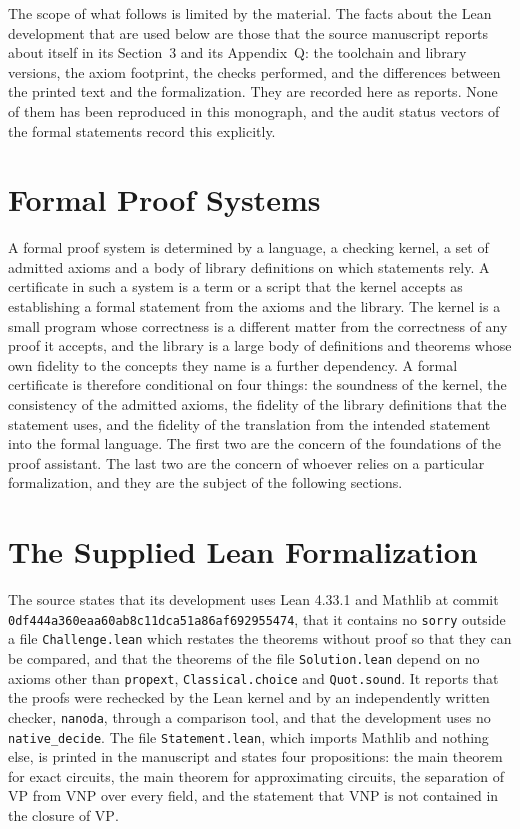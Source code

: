 \documentclass[11pt,letterpaper]{report}
\theoremstyle{plain}
\theoremstyle{definition}
\theoremstyle{remark}
\newcommand{\VP}{\mathrm{VP}}
\newcommand{\VNP}{\mathrm{VNP}}
\begin{document}
The scope of what follows is limited by the material. The facts about the Lean development that are used below are those that the source manuscript reports about itself in its Section~3 and its Appendix~Q: the toolchain and library versions, the axiom footprint, the checks performed, and the differences between the printed text and the formalization. They are recorded here as reports. None of them has been reproduced in this monograph, and the audit status vectors of the formal statements record this explicitly.

\section{Formal Proof Systems}

A formal proof system is determined by a language, a checking kernel, a set of admitted axioms and a body of library definitions on which statements rely. A certificate in such a system is a term or a script that the kernel accepts as establishing a formal statement from the axioms and the library. The kernel is a small program whose correctness is a different matter from the correctness of any proof it accepts, and the library is a large body of definitions and theorems whose own fidelity to the concepts they name is a further dependency. A formal certificate is therefore conditional on four things: the soundness of the kernel, the consistency of the admitted axioms, the fidelity of the library definitions that the statement uses, and the fidelity of the translation from the intended statement into the formal language. The first two are the concern of the foundations of the proof assistant. The last two are the concern of whoever relies on a particular formalization, and they are the subject of the following sections.

\section{The Supplied Lean Formalization}

The source states that its development uses Lean 4.33.1 and Mathlib at commit \texttt{0df444a360eaa60ab8c1\allowbreak1dca51a86af692955474}, that it contains no \texttt{sorry} outside a file \texttt{Challenge.lean} which restates the theorems without proof so that they can be compared, and that the theorems of the file \texttt{Solution.lean} depend on no axioms other than \texttt{propext}, \texttt{Classical.choice} and \texttt{Quot.sound}. It reports that the proofs were rechecked by the Lean kernel and by an independently written checker, \texttt{nanoda}, through a comparison tool, and that the development uses no \texttt{native\_decide}. The file \texttt{Statement.lean}, which imports Mathlib and nothing else, is printed in the manuscript and states four propositions: the main theorem for exact circuits, the main theorem for approximating circuits, the separation of $\VP$ from $\VNP$ over every field, and the statement that $\VNP$ is not contained in the closure of $\VP$.
\end{document}
